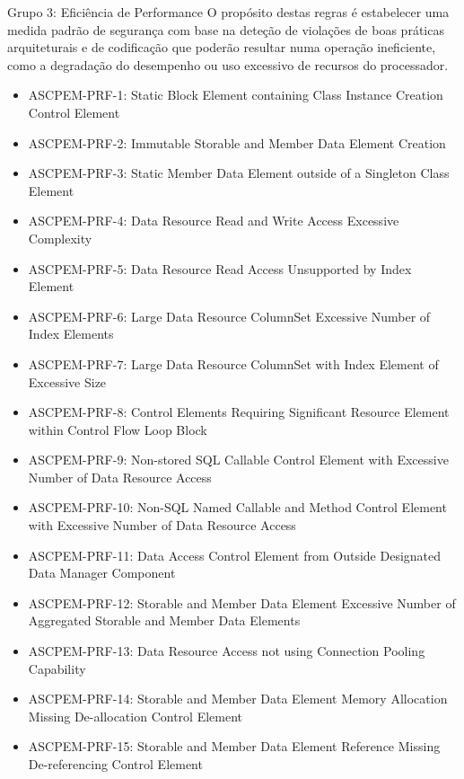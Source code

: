 \documentclass[openany,10pt,a4paper]{article}
\begin{document}
\begin{longtable}
\begin{appendix}
Grupo 3: Eficiência de Performance
O propósito destas regras é estabelecer uma medida padrão de segurança com base na deteção de violações de boas práticas arquiteturais e de codificação que poderão resultar numa operação ineficiente, como a degradação do desempenho ou uso excessivo de recursos do processador.
\begin{itemize}	
\setlength\itemsep{0em}
	\item ASCPEM-PRF-1: Static Block Element containing Class Instance Creation Control Element
	\item ASCPEM-PRF-2: Immutable Storable and Member Data Element Creation
	\item ASCPEM-PRF-3: Static Member Data Element outside of a Singleton Class Element
	\item ASCPEM-PRF-4: Data Resource Read and Write Access Excessive Complexity
	\item ASCPEM-PRF-5: Data Resource Read Access Unsupported by Index Element
	\item ASCPEM-PRF-6: Large Data Resource ColumnSet Excessive Number of Index Elements
	\item ASCPEM-PRF-7: Large Data Resource ColumnSet with Index Element of Excessive Size
	\item ASCPEM-PRF-8: Control Elements Requiring Significant Resource Element within Control Flow Loop Block
	\item ASCPEM-PRF-9: Non-stored SQL Callable Control Element with Excessive Number of Data Resource Access
	\item ASCPEM-PRF-10: Non-SQL Named Callable and Method Control Element with Excessive Number of Data Resource Access
	\item ASCPEM-PRF-11: Data Access Control Element from Outside Designated Data Manager Component
	\item ASCPEM-PRF-12: Storable and Member Data Element Excessive Number of Aggregated Storable and Member Data Elements
	\item ASCPEM-PRF-13: Data Resource Access not using Connection Pooling Capability
	\item ASCPEM-PRF-14: Storable and Member Data Element Memory Allocation Missing De-allocation Control Element
	\item ASCPEM-PRF-15: Storable and Member Data Element Reference Missing De-referencing Control Element
\end{itemize}


\end{appendix}
\end{longtable}
\end{document}

